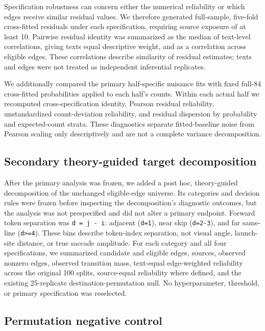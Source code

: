 \documentclass[11pt]{article}
\begin{document}
Specification robustness can concern either the numerical reliability or which edges receive similar residual values. We therefore generated full-sample, five-fold cross-fitted residuals under each specification, requiring source exposure of at least 10. Pairwise residual identity was summarized as the median of text-level correlations, giving texts equal descriptive weight, and as a correlation across eligible edges. These correlations describe similarity of residual estimates; texts and edges were not treated as independent inferential replicates.

We additionally compared the primary half-specific nuisance fits with fixed full-84 cross-fitted probabilities applied to each half's counts. Within each actual half we recomputed cross-specification identity, Pearson residual reliability, unstandardized count-deviation reliability, and residual dispersion by probability and expected-count strata. These diagnostics separate fitted-baseline noise from Pearson scaling only descriptively and are not a complete variance decomposition.

\subsection{Secondary theory-guided target decomposition}

After the primary analysis was frozen, we added a post hoc, theory-guided decomposition of the unchanged eligible-edge universe. Its categories and decision rules were frozen before inspecting the decomposition's diagnostic outcomes, but the analysis was not prespecified and did not alter a primary endpoint. Forward token separation was \texttt{d = j - i}: adjacent (\texttt{d=1}), near skip (\texttt{d=2-3}), and far same-line (\texttt{d>=4}). These bins describe token-index separation, not visual angle, launch-site distance, or true saccade amplitude. For each category and all four specifications, we summarized candidate and eligible edges, sources, observed nonzero edges, observed transition mass, text-equal edge-weighted reliability across the original 100 splits, source-equal reliability where defined, and the existing 25-replicate destination-permutation null. No hyperparameter, threshold, or primary specification was reselected.

\subsection{Permutation negative control}
\end{document}
